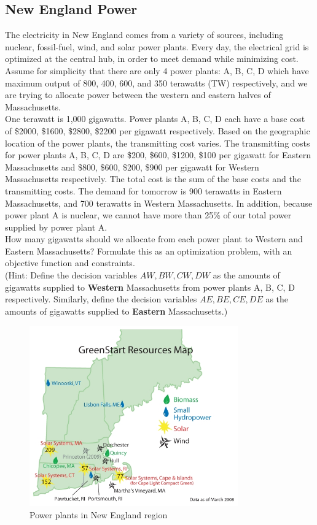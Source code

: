 \documentclass[12pt]{article}
\begin{document}

\subsection{New England Power}
The electricity in New England comes from a variety of sources, including nuclear, fossil-fuel, wind, and solar power plants.  
Every day, the electrical grid is optimized at the central hub, in order to meet demand while minimizing cost.  Assume for simplicity that there are only 4 power plants: A, B, C, D which have maximum output of 800, 400, 600, and 350 terawatts (TW) respectively, and we are trying to allocate power between the western and eastern halves of Massachusetts.  \\

One terawatt is 1,000 gigawatts.  Power plants A, B, C, D each have a base cost of \$2000, \$1600, \$2800, \$2200 per gigawatt respectively.  Based on the geographic location of the power plants, the transmitting cost varies.  The transmitting costs for power plants A, B, C, D are \$200, \$600, \$1200, \$100 per gigawatt for Eastern Massachusetts and \$800, \$600, \$200, \$900 per gigawatt for Western Massachusetts respectively.  The total cost is the sum of the base costs and the transmitting costs.  The demand for tomorrow is 900 terawatts in Eastern Massachusetts, and 700 terawatts in Western Massachusetts.   In addition, because power plant A is nuclear, we cannot have more than 25\% of our total power supplied by power plant A.  \\

 How many gigawatts should we allocate from each power plant to Western and Eastern Massachusetts?  Formulate this as an optimization problem, with an objective function and constraints. \\
 
(Hint: Define the decision variables $AW, BW, CW, DW$ as the amounts of gigawatts supplied to {\bf Western} Massachusetts from power plants A, B, C, D respectively.  Similarly, define the decision variables $AE, BE, CE, DE$ as the amounts of gigawatts supplied to {\bf Eastern} Massachusetts.)

\begin{figure}[ht!]
\centering
    \includegraphics[width=0.8\textwidth]{pictures/resource_map_08}
        \caption{Power plants in New England region}
\end{figure}
\end{document}
